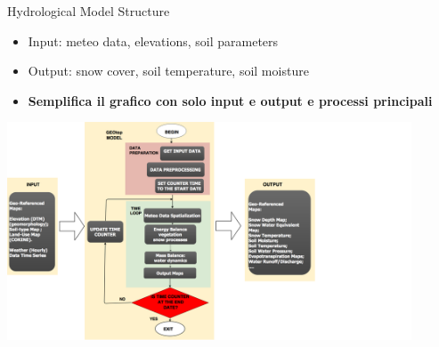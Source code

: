 \documentclass[ignorenonframetext,]{beamer}
\providecommand{\tightlist}{%
  \setlength{\itemsep}{0pt}\setlength{\parskip}{0pt}}
\begin{document}
\begin{frame}{Hydrological Model Structure}

\begin{itemize}
\tightlist
\item
  Input: meteo data, elevations, soil parameters
\item
  Output: snow cover, soil temperature, soil moisture
\item
  \textbf{Semplifica il grafico con solo input e output e processi
  principali}
\end{itemize}

\includegraphics[width=0.90000\textwidth]{resources/images/geotop_revised.png}\\

\end{frame}
\end{document}
